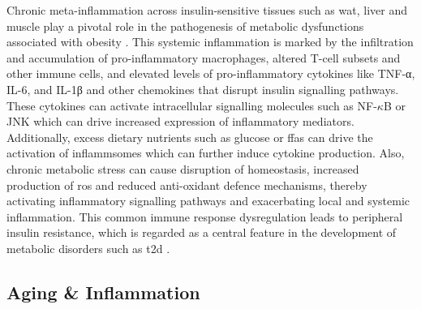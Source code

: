 \par Chronic meta-inflammation across insulin-sensitive tissues such as \gls{wat}, liver and muscle play a pivotal role in the pathogenesis of metabolic dysfunctions associated with obesity \textbf{\cite{gregor_inflammatory_2011,hotamisligil_inflammation_2017}}. This systemic inflammation is marked by the infiltration and accumulation of pro-inflammatory macrophages, altered T-cell subsets and other immune cells, and elevated levels of pro-inflammatory cytokines like TNF-α, IL-6, and IL-1β and other chemokines that disrupt insulin signalling pathways. These cytokines can activate intracellular signalling molecules such as NF-$\kappa$B or JNK which can drive increased expression of inflammatory mediators. Additionally, excess dietary nutrients such as glucose or \glspl{ffa} can drive the activation of inflammsomes which can further induce cytokine production. Also, chronic metabolic stress can cause disruption of  homeostasis, increased production of \gls{ros} and reduced anti-oxidant defence mechanisms, thereby activating inflammatory signalling pathways and exacerbating local and systemic inflammation. This common immune response dysregulation leads to peripheral insulin resistance, which is regarded as a central feature in the development of metabolic disorders such as \gls{t2d} \textbf{\cite{greenberg_obesity_2006,wu_metabolic_2020,luo_inflammation_2020,kawai_adipose_2021,kim_metabolic_2021,rohm_inflammation_2022,wu_skeletal_nodate}}.

\subsection{Aging \& Inflammation}
\label{sec:immune_aging}

